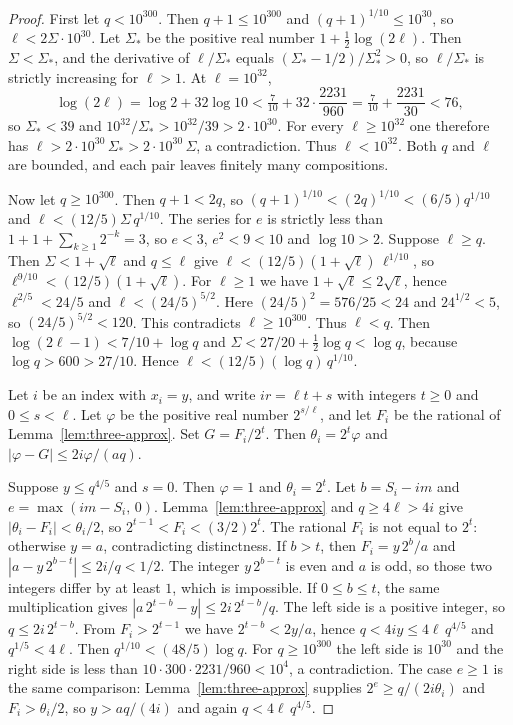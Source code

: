 \documentclass[11pt]{article}
\begin{document}
\begin{proof}
First let $q < 10^{300}$.
Then $q+1 \le 10^{300}$ and $(q+1)^{1/10} \le 10^{30}$, so $\ell < 2\Sigma \cdot 10^{30}$.
Let $\Sigma_*$ be the positive real number $1 + \tfrac12\log(2\ell)$.
Then $\Sigma < \Sigma_*$, and the derivative of $\ell/\Sigma_*$ equals $(\Sigma_* - 1/2)/\Sigma_*^2 > 0$, so $\ell/\Sigma_*$ is strictly increasing for $\ell > 1$.
At $\ell = 10^{32}$,
\[
\log(2\ell) = \log 2 + 32\log 10 < \tfrac{7}{10} + 32\cdot\frac{2231}{960} = \tfrac{7}{10} + \frac{2231}{30} < 76,
\]
so $\Sigma_* < 39$ and $10^{32}/\Sigma_* > 10^{32}/39 > 2 \cdot 10^{30}$.
For every $\ell \ge 10^{32}$ one therefore has $\ell > 2 \cdot 10^{30}\, \Sigma_* > 2 \cdot 10^{30}\, \Sigma$, a contradiction.
Thus $\ell < 10^{32}$.
Both $q$ and $\ell$ are bounded, and each pair leaves finitely many compositions.

Now let $q \ge 10^{300}$.
Then $q+1 < 2q$, so $(q+1)^{1/10} < (2q)^{1/10} < (6/5)q^{1/10}$ and $\ell < (12/5)\Sigma\, q^{1/10}$.
The series for $e$ is strictly less than $1 + 1 + \sum_{k \ge 1} 2^{-k} = 3$, so $e < 3$, $e^2 < 9 < 10$ and $\log 10 > 2$.
Suppose $\ell \ge q$.
Then $\Sigma < 1 + \sqrt{\ell}$ and $q \le \ell$ give $\ell < (12/5)(1+\sqrt{\ell})\,\ell^{1/10}$, so $\ell^{9/10} < (12/5)(1+\sqrt{\ell})$.
For $\ell \ge 1$ we have $1+\sqrt{\ell} \le 2\sqrt{\ell}$, hence $\ell^{2/5} < 24/5$ and $\ell < (24/5)^{5/2}$.
Here $(24/5)^2 = 576/25 < 24$ and $24^{1/2} < 5$, so $(24/5)^{5/2} < 120$.
This contradicts $\ell \ge 10^{300}$.
Thus $\ell < q$.
Then $\log(2\ell-1) < 7/10 + \log q$ and $\Sigma < 27/20 + \tfrac12\log q < \log q$, because $\log q > 600 > 27/10$.
Hence $\ell < (12/5)(\log q)\, q^{1/10}$.

Let $i$ be an index with $x_i = y$, and write $ir = \ell t + s$ with integers $t \ge 0$ and $0 \le s < \ell$.
Let $\varphi$ be the positive real number $2^{s/\ell}$, and let $F_i$ be the rational of Lemma~\ref{lem:three-approx}.
Set $G = F_i/2^t$.
Then $\theta_i = 2^t\varphi$ and $|\varphi - G| \le 2i\varphi/(aq)$.

Suppose $y \le q^{4/5}$ and $s = 0$.
Then $\varphi = 1$ and $\theta_i = 2^t$.
Let $b = S_i - im$ and $e = \max(im - S_i,\, 0)$.
Lemma~\ref{lem:three-approx} and $q \ge 4\ell > 4i$ give $|\theta_i - F_i| < \theta_i/2$, so $2^{t-1} < F_i < (3/2)2^t$.
The rational $F_i$ is not equal to $2^t$: otherwise $y = a$, contradicting distinctness.
If $b > t$, then $F_i = y\, 2^b/a$ and $|a - y\, 2^{b-t}| \le 2i/q < 1/2$.
The integer $y\, 2^{b-t}$ is even and $a$ is odd, so those two integers differ by at least $1$, which is impossible.
If $0 \le b \le t$, the same multiplication gives $|a\, 2^{t-b} - y| \le 2i\, 2^{t-b}/q$.
The left side is a positive integer, so $q \le 2i\, 2^{t-b}$.
From $F_i > 2^{t-1}$ we have $2^{t-b} < 2y/a$, hence $q < 4iy \le 4\ell\, q^{4/5}$ and $q^{1/5} < 4\ell$.
Then $q^{1/10} < (48/5)\log q$.
For $q \ge 10^{300}$ the left side is $10^{30}$ and the right side is less than $10 \cdot 300 \cdot 2231/960 < 10^4$, a contradiction.
The case $e \ge 1$ is the same comparison: Lemma~\ref{lem:three-approx} supplies $2^e \ge q/(2i\theta_i)$ and $F_i > \theta_i/2$, so $y > aq/(4i)$ and again $q < 4\ell\, q^{4/5}$.


\end{proof}
\end{document}
